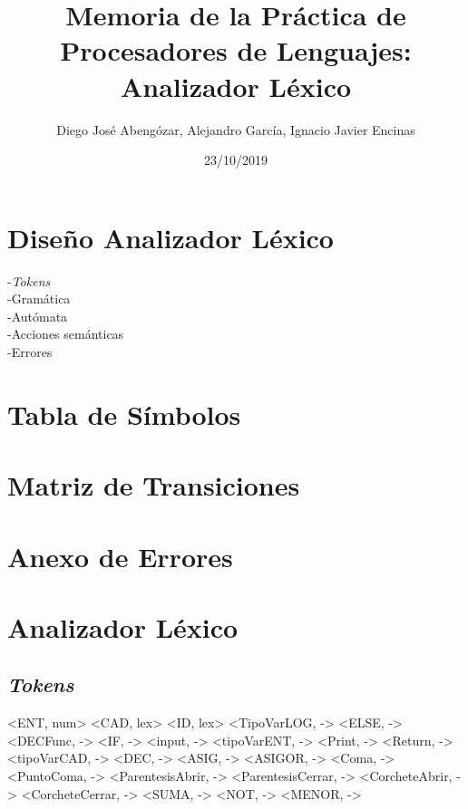 \documentclass{article}
\title{Memoria de la Práctica de Procesadores de Lenguajes: Analizador Léxico}
\author{Diego José Abengózar, Alejandro García, Ignacio Javier Encinas}
\date{23/10/2019}
\begin{document}
\newpage
\maketitle 
\section{Diseño Analizador Léxico}
-\emph{Tokens}\\ -Gramática\\ -Autómata\\ -Acciones semánticas \\ -Errores
\section{Tabla de Símbolos}
\section{Matriz de Transiciones}
\section{Anexo de Errores}
\newpage


\section*{Analizador Léxico}
\subsection*{\emph{Tokens}}

\< \>
\newline \medskip
<ENT, num>
\newline \medskip
<CAD, lex>
\newline \medskip
<ID, lex>
\newline \medskip
<TipoVarLOG, ->
\newline \medskip
<ELSE, ->
\newline \medskip
<DECFunc, ->
\newline \medskip
<IF, ->
\newline \medskip
<input, ->
\newline \medskip
<tipoVarENT, ->
\newline \medskip
<Print, ->
\newline \medskip
<Return, ->
\newline \medskip
<tipoVarCAD, ->
\newline \medskip
<DEC, ->
\newline \medskip
<ASIG, ->
\newline \medskip
<ASIGOR, ->
\newline \medskip
<Coma, ->
\newline \medskip
<PuntoComa, ->
\newline \medskip
<ParentesisAbrir, ->
\newline \medskip
<ParentesisCerrar, ->
\newline \medskip
<CorcheteAbrir, ->
\newline \medskip
<CorcheteCerrar, ->
\newline \medskip
<SUMA, ->
\newline \medskip
<NOT, ->
\newline \medskip
<MENOR, ->
\end{document}
